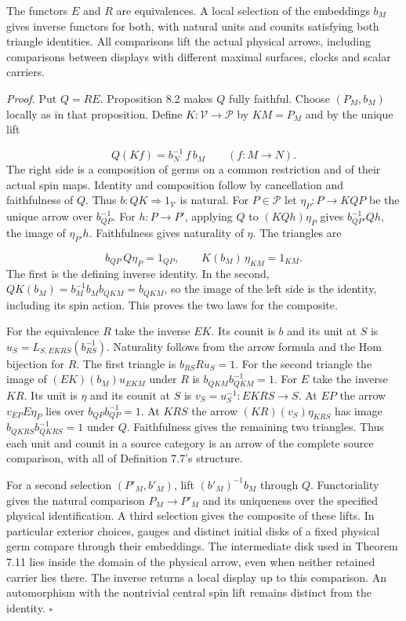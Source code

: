 \documentclass[
  english,
  11pt,
  reqno]{amsart}
\begin{document}
The functors \(E\) and \(R\) are equivalences. A local selection of the
embeddings \(b_M\) gives inverse functors for both, with natural units
and counits satisfying both triangle identities. All comparisons lift
the actual physical arrows, including comparisons between displays with
different maximal surfaces, clocks and scalar carriers.

\emph{Proof.} Put \(Q=RE\). Proposition 8.2 makes \(Q\) fully faithful.
Choose \((P_M,b_M)\) locally as in that proposition. Define
\(K:\mathcal V\to\mathcal P\) by \(K M=P_M\) and by the unique lift

\label{eq:local-selected-inverse-on-arrows} \[
Q(K f)= b_N^{-1}\,f\, b_M
\qquad (f:M\longrightarrow N).
\] The right side is a composition of germs on a common restriction and
of their actual spin maps. Identity and composition follow by
cancellation and faithfulness of \(Q\). Thus
\(b:QK\Rightarrow 1_{\mathcal V}\) is natural. For \(P\in\mathcal P\)
let \(\eta_P:P\to KQP\) be the unique arrow over \(b_{QP}^{-1}\). For
\(h:P\to P'\), applying \(Q\) to \((KQh)\eta_P\) gives
\(b_{QP'}^{-1} Q h\), the image of \(\eta_{P'}h\). Faithfulness gives
naturality of \(\eta\). The triangles are

\label{eq:local-selected-inverse-triangles} \[
b_{QP}\,Q\eta_P=1_{QP},\qquad K(b_M)\,\eta_{KM}=1_{KM}.
\] The first is the defining inverse identity. In the second,
\(QK(b_M)=b_M^{-1}b_M b_{QKM}=b_{QKM}\), so the image of the left side
is the identity, including its spin action. This proves the two laws for
the composite.

For the equivalence \(R\) take the inverse \(E K\). Its counit is \(b\)
and its unit at \(S\) is \(u_S=L_{S,EKRS}(b_{RS}^{-1})\). Naturality
follows from the arrow formula and the Hom bijection for \(R\). The
first triangle is \(b_{RS} R u_S=1\). For the second triangle the image
of \((EK)(b_M)u_{EKM}\) under \(R\) is \(b_{QKM}b_{QKM}^{-1}=1\). For
\(E\) take the inverse \(K R\). Its unit is \(\eta\) and its counit at
\(S\) is \(v_S=u_S^{-1}:EKRS\to S\). At \(EP\) the arrow
\(v_{EP} E\eta_P\) lies over \(b_{QP}b_{QP}^{-1}=1\). At \(KRS\) the
arrow \((KR)(v_S)\eta_{KRS}\) has image \(b_{QKRS}b_{QKRS}^{-1}=1\)
under \(Q\). Faithfulness gives the remaining two triangles. Thus each
unit and counit in a source category is an arrow of the complete source
comparison, with all of Definition 7.7's structure.

For a second selection \((P'_M,b'_M)\), lift \((b'_M)^{-1}b_M\) through
\(Q\). Functoriality gives the natural comparison \(P_M\to P'_M\) and
its uniqueness over the specified physical identification. A third
selection gives the composite of these lifts. In particular exterior
choices, gauges and distinct initial disks of a fixed physical germ
compare through their embeddings. The intermediate disk used in Theorem
7.11 lies inside the domain of the physical arrow, even when neither
retained carrier lies there. The inverse returns a local display up to
this comparison. An automorphism with the nontrivial central spin lift
remains distinct from the identity. \hfill\(\square\)
\end{document}
